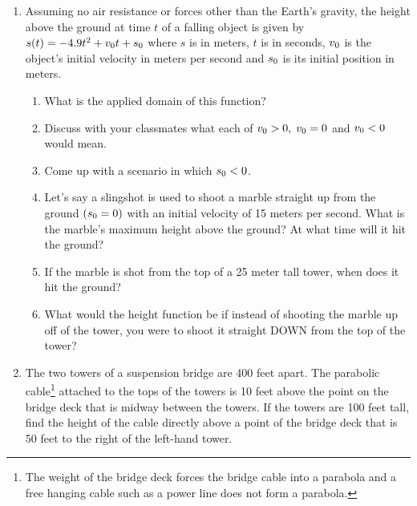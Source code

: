 \begin{enumerate}
\newpage

\item Assuming no air resistance or forces other than the Earth's gravity, the height above the ground at time $t$ of a falling object is given by $s(t) = -4.9t^{2} + v_{\mbox{\scriptsize $0$}}t + s_{\mbox{\scriptsize $0$}}$ where $s$ is in meters, $t$ is in seconds, $v_{\mbox{\scriptsize $0$}}$ is the object's initial velocity in meters per second and $s_{\mbox{\scriptsize $0$}}$ is its initial position in meters.  
\label{whatgoesup}

\begin{enumerate}

\item What is the applied domain of this function?
\item Discuss with your classmates what each of $v_{\mbox{\scriptsize $0$}} > 0, \; v_{\mbox{\scriptsize $0$}} = 0$ and $v_{\mbox{\scriptsize $0$}} < 0$ would mean.
\item Come up with a scenario in which $s_{\mbox{\scriptsize $0$}} < 0$.
\item Let's say a slingshot is used to shoot a marble straight up from the ground $(s_{\mbox{\scriptsize $0$}} = 0)$ with an initial velocity of 15 meters per second.  What is the marble's maximum height above the ground?  At what time will it hit the ground?
\item If the marble is shot from the top of a 25 meter tall tower,  when does it hit the ground?
\item What would the height function be if instead of shooting the marble up off of the tower, you were to shoot it straight DOWN from the top of the tower?

\end{enumerate}


\item \label{parabolicbridgecable} The two towers of a suspension bridge are 400 feet apart.  The parabolic cable\footnote{The weight of the bridge deck forces the bridge cable into a parabola and a free hanging cable such as a power line does not form a parabola.  } attached to the tops of the towers is 10 feet above the point on the bridge deck that is midway between the towers.  If the towers are 100 feet tall, find the height of the cable directly above a point of the bridge deck that is 50 feet to the right of the left-hand tower.


\end{enumerate}
